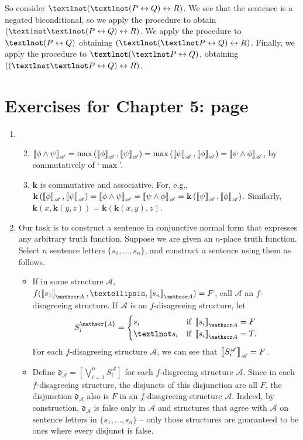 {\begin{enumerate}
So consider $¬(¬(P\bicond Q)\bicond R)$. We see that the sentence is a negated biconditional, so we apply the procedure to obtain $(¬¬(P \bicond Q) \bicond R)$. We apply the procedure to $¬(P\bicond Q)$ obtaining $(¬(¬P \bicond Q)\bicond R)$. Finally, we apply the procedure to $¬(¬P \bicond Q)$, obtaining $((¬¬P \bicond Q) \bicond R)$.

\end{enumerate}

\section*{Exercises for Chapter 5: page \pageref{ex5}} \label{ans5}

\begin{enumerate}
\item \begin{enumerate}\setcounter{enumii}{1}
	\item 	$\left\llbracket \phi \wedge \psi\right\rrbracket_{\mathscr{A}} = \max\left(\left\llbracket \phi\right\rrbracket_{\mathscr{A}},\left\llbracket \psi\right\rrbracket_{\mathscr{A}}\right) = \max\left(\left\llbracket \psi\right\rrbracket_{\mathscr{A}},\left\llbracket \phi\right\rrbracket_{\mathscr{A}}\right) = \left\llbracket \psi\wedge \phi\right\rrbracket_{\mathscr{A}}$, by commutatively of `$\max$'. 
	\item $\mathbf{k}$ is commutative and associative. For, e.g., $\mathbf{k}\left(\left\llbracket \phi\right\rrbracket_{\mathscr{A}},\left\llbracket \psi\right\rrbracket_{\mathscr{A}}\right) = \left\llbracket \phi \wedge \psi\right\rrbracket_{\mathscr{A}} = \left\llbracket \psi \wedge \phi\right\rrbracket_{\mathscr{A}} = \mathbf{k}\left(\left\llbracket \psi\right\rrbracket_{\mathscr{A}},\left\llbracket \phi\right\rrbracket_{\mathscr{A}}\right)$. Similarly, $\mathbf{k}(x,\mathbf{k}(y,z)) = \mathbf{k}(\mathbf{k}(x,y),z)$.
\end{enumerate}\setcounter{enumi}{3}
\item Our task is to construct a sentence in conjunctive normal form that expresses any arbitrary truth function. Suppose we are given an $n$-place truth function. Select $n$ sentence letters $\{s_{1},…,s_{n}\}$, and construct a sentence using them as follows. \begin{itemize}
	\item If in some structure $\mathscr{A}$, $f(\val{s_{1}}{A},…,\val{s_{n}}{A}) = F$, call $\mathscr{A}$ an $f$-disagreeing structure. If $\mathscr{A}$ is an $f$-disagreeing structure, let $$S^{\mathscr{A}}_{i} = \begin{cases}
		s_{i} &\text{if } \val{s_{i}}{A} = F\\	
		¬s_{i} &\text{if } \val{s_{i}}{A} = T.
	\end{cases}$$ For each $f$-disagreeing structure $\mathscr{A}$, we can see that $\left\llbracket S_{i}^{\mathscr{A}}\right\rrbracket_{\mathscr{A}} = F$.
	\item Define $\mathfrak{d}_{\mathscr{A}} = \left[\bigvee_{i=1}^{n}S^{\mathscr{A}}_{i}\right]$ for each $f$-disgreeing structure $\mathscr{A}$. Since in each $f$-disagreeing structure, the disjuncts of this disjunction are all $F$, the disjunction $\mathfrak{d}_{\mathscr{A}}$ also is $F$ in an $f$-disagreeing structure $\mathscr{A}$. Indeed, by construction, $\mathfrak{d}_{\mathscr{A}}$ is false only in $\mathscr{A}$ and structures that agree with $\mathscr{A}$ on sentence letters in $\{s_{1},…,s_{n}\}$ – only those structures are guaranteed to be ones where every disjunct is false. 


\end{itemize}
\end{enumerate}}
